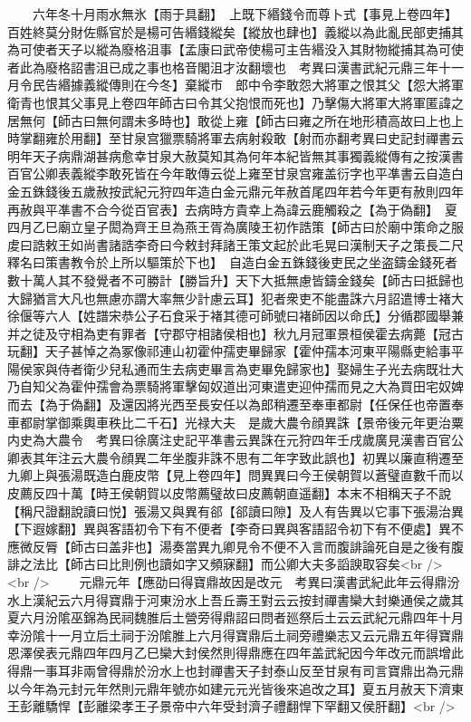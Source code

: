 　　六年冬十月雨水無氷【雨于具翻】　上既下緡錢令而尊卜式【事見上卷四年】百姓終莫分財佐縣官於是楊可告緡錢縱矣【縱放也肆也】義縱以為此亂民部吏捕其為可使者天子以縱為廢格沮事【孟康曰武帝使楊可主告緡没入其財物縱捕其為可使者此為廢格詔書沮已成之事也格音閣沮才汝翻壞也　考異曰漢書武紀元鼎三年十一月令民告緡據義縱傳則在今冬】棄縱市　郎中令李敢怨大將軍之恨其父【怨大將軍衛青也恨其父事見上卷四年師古曰令其父抱恨而死也】乃擊傷大將軍大將軍匿諱之居無何【師古曰無何謂未多時也】敢從上雍【師古曰雍之所在地形積高故曰上也上時掌翻雍於用翻】至甘泉宫獵票騎將軍去病射殺敢【射而亦翻考異曰史記封禪書云明年天子病鼎湖甚病愈幸甘泉大赦莫知其為何年本紀皆無其事獨義縱傳有之按漢書百官公卿表義縱李敢死皆在今年敢傳云從上雍至甘泉宫雍盖衍字也平凖書云自造白金五銖錢後五歲赦按武紀元狩四年造白金元鼎元年赦首尾四年若今年更有赦則四年再赦與平凖書不合今從百官表】去病時方貴幸上為諱云鹿觸殺之【為于偽翻】　夏四月乙巳廟立皇子閎為齊王旦為燕王胥為廣陵王初作誥策【師古曰於廟中策命之服䖍曰誥敕王如尚書諸誥李奇曰今敕封拜諸王策文起於此毛晃曰漢制天子之策長二尺釋名曰策書教令於上所以驅策於下也】　自造白金五銖錢後吏民之坐盗鑄金錢死者數十萬人其不發覺者不可勝計【勝旨升】天下大抵無慮皆鑄金錢矣【師古曰抵歸也大歸猶言大凡也無慮亦謂大率無少計慮云耳】犯者衆吏不能盡誅六月詔遣博士褚大徐偃等六人【姓譜宋恭公子石食采于褚其德可師號曰褚師因以命氏】分循郡國舉兼并之徒及守相為吏有罪者【守郡守相諸侯相也】秋九月冠軍景桓侯霍去病薨【冠古玩翻】天子甚悼之為冢像祁連山初霍仲孺吏畢歸家【霍仲孺本河東平陽縣吏給事平陽侯家與侍者衛少兒私通而生去病吏畢言為吏畢免歸家也】娶婦生子光去病既壮大乃自知父為霍仲孺會為票騎將軍擊匈奴道出河東遣吏迎仲孺而見之大為買田宅奴婢而去【為于偽翻】及還因將光西至長安任以為郎稍遷至奉車都尉【任保任也帝置奉車都尉掌御乘輿車秩比二千石】光禄大夫　是歲大農令顔異誅【景帝後元年更治粟内史為大農令　考異曰徐廣注史記平凖書云異誅在元狩四年壬戌歲廣見漢書百官公卿表其年注云大農令顔異二年坐腹非誅不思有二年字致此誤也】初異以廉直稍遷至九卿上與張湯既造白鹿皮幣【見上卷四年】問異異曰今王侯朝賀以蒼璧直數千而以皮薦反四十萬【時王侯朝賀以皮幣薦璧故曰皮薦朝直遥翻】本末不相稱天子不說【稱尺證翻說讀曰悦】張湯又與異有郤【郤讀曰隙】及人有告異以它事下張湯治異【下遐嫁翻】異與客語初令下有不便者【李奇曰異與客語詔令初下有不便處】異不應微反脣【師古曰盖非也】湯奏當異九卿見令不便不入言而腹誹論死自是之後有腹誹之法比【師古曰比則例也讀如字又頻寐翻】而公卿大夫多謟諛取容矣<br />
<br />
　　元鼎元年【應劭曰得寶鼎故因是改元　考異曰漢書武紀此年云得鼎汾水上漢紀云六月得寶鼎于河東汾水上吾丘壽王對云云按封禪書欒大封樂通侯之歲其夏六月汾隂巫錦為民祠魏脽后土營旁得鼎詔曰問者廵祭后土云云武紀元鼎四年十月幸汾隂十一月立后土祠于汾隂脽上六月得寶鼎后土祠旁禮樂志又云元鼎五年得寶鼎恩澤侯表元鼎四年四月乙巳欒大封侯然則得鼎應在四年盖武紀因今年改元而誤增此得鼎一事耳非兩曾得鼎於汾水上也封禪書天子封泰山反至甘泉有司言寶鼎出為元鼎以今年為元封元年然則元鼎年號亦如建元元光皆後來追改之耳】夏五月赦天下濟東王彭離驕悍【彭離梁孝王子景帝中六年受封濟子禮翻悍下罕翻又侯肝翻】<br />
